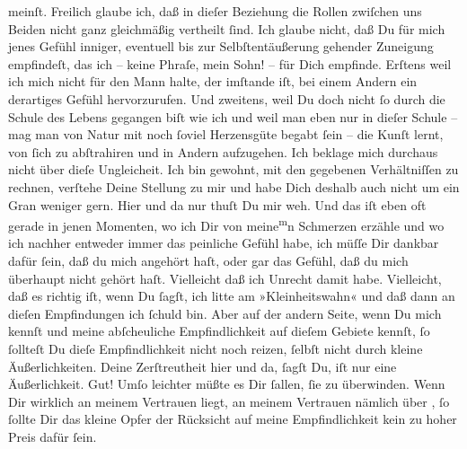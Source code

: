                meinſt. Freilich glaube ich, daß in dieſer Beziehung die Rollen zwiſchen uns Beiden
               nicht ganz gleichmäßig vertheilt ſind. Ich glaube nicht, daß Du für mich jenes Gefühl
               inniger, eventuell bis zur Selbſtentäußerung gehender Zuneigung empfindeſt, das ich –
               keine Phraſe, mein Sohn! – für Dich empfinde. Erſtens weil ich mich nicht für den
               Mann halte, der imſtande iſt, bei einem Andern  ein derartiges Gefühl hervorzurufen. {\pb}Und
               zweitens, weil Du doch nicht ſo durch die Schule des Lebens gegangen biſt wie ich und
               weil man eben nur in dieſer Schule – mag man von Natur mit noch ſoviel Herzensgüte
               begabt ſein – die Kunſt lernt, von ſich zu abſtrahiren und in Andern aufzugehen. Ich
               beklage mich durchaus nicht über dieſe Ungleicheit. Ich bin gewohnt, mit den
               gegebenen Verhältniſſen zu rechnen, verſtehe Deine Stellung zu mir und habe Dich
               deshalb auch nicht um ein\strikeout{\textcolor{gray}{en}} Gran weniger {\pb}gern. Hier und da nur thuſt Du
               mir weh. Und das iſt eben oft gerade in jenen Momenten,  wo ich Dir von meine\substVorne{}\textsuperscript{m}\substDazwischen{}n\substHinten{} Schmerzen erzähle und wo ich nachher entweder immer das peinliche Gefühl
               habe, ich müſſe Dir dankbar dafür ſein, daß du mich angehört haſt, oder gar das
               Gefühl, daß du mich überhaupt nicht gehört haſt. Vielleicht daß ich Unrecht damit
               habe. Vielleicht, daß es richtig iſt, wenn Du ſagſt, ich litte am »Kleinheitswahn«
               und daß dann an dieſen Empfindungen ich ſchuld bin. Aber auf der andern Seite, wenn
               Du mich kennſt und meine abſcheuliche Empfindlichkeit auf dieſem Gebiete kennſt, ſo
               ſollteſt Du dieſe Empfindlichkeit nicht noch reizen,  ſelbſt nicht durch kleine Äußerlichkeiten. Deine Zerſtreutheit {\pb}hier und da, ſagſt Du, iſt nur eine Äußerlichkeit.
               Gut! Umſo leichter müßte es Dir ſallen, ſie zu überwinden. Wenn Dir wirklich an
               meinem Vertrauen liegt, an meinem Vertrauen nämlich über \label{K_L02651-2v}\label{K_L02651-2}, ſo ſollte Dir das kleine Opfer der Rücksicht auf meine
               Empfindlichkeit kein zu hoher Preis dafür ſein.\pend
           
